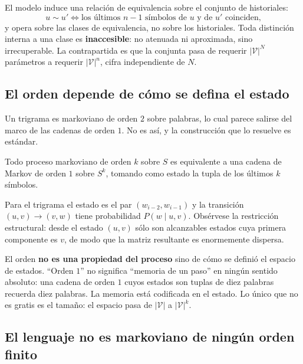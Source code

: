 \documentclass[11pt,letterpaper]{article}
\newcommand{\Vocab}{\mathcal{V}}
\begin{document}
\begin{idea}[title={Qué se pierde, exactamente}]
El modelo induce una relación de equivalencia sobre el conjunto de historiales:
\[
u \sim u' \iff \text{los últimos } n-1 \text{ símbolos de } u \text{ y de } u'
\text{ coinciden,}
\]
y opera sobre las clases de equivalencia, no sobre los historiales. Toda
distinción interna a una clase es \textbf{inaccesible}: no atenuada ni
aproximada, sino irrecuperable. La contrapartida es que la conjunta pasa de
requerir $|\Vocab|^N$ parámetros a requerir $|\Vocab|^{n}$, cifra independiente
de $N$.
\end{idea}

\subsection{El orden depende de cómo se defina el estado}

Un trigrama es markoviano de orden $2$ sobre palabras, lo cual parece salirse
del marco de las cadenas de orden $1$. No es así, y la construcción que lo
resuelve es estándar.

\begin{proposicion}\label{prop:orden}
Todo proceso markoviano de orden $k$ sobre $S$ es equivalente a una cadena de
Markov de orden $1$ sobre $S^k$, tomando como estado la tupla de los últimos $k$
símbolos.
\end{proposicion}

Para el trigrama el estado es el par $(w_{i-2},w_{i-1})$ y la transición
$(u,v)\to(v,w)$ tiene probabilidad $P(w\mid u,v)$. Obsérvese la restricción
estructural: desde el estado $(u,v)$ sólo son alcanzables estados cuya primera
componente es $v$, de modo que la matriz resultante es enormemente dispersa.

\begin{idea}[title={Consecuencia conceptual}]
El orden \textbf{no es una propiedad del proceso} sino de cómo se definió el
espacio de estados. ``Orden $1$'' no significa ``memoria de un paso'' en ningún
sentido absoluto: una cadena de orden $1$ cuyos estados son tuplas de diez
palabras recuerda diez palabras. La memoria está codificada en el estado. Lo
único que no es gratis es el tamaño: el espacio pasa de $|\Vocab|$ a
$|\Vocab|^{k}$.
\end{idea}

\subsection{El lenguaje no es markoviano de ningún orden finito}
\end{document}
